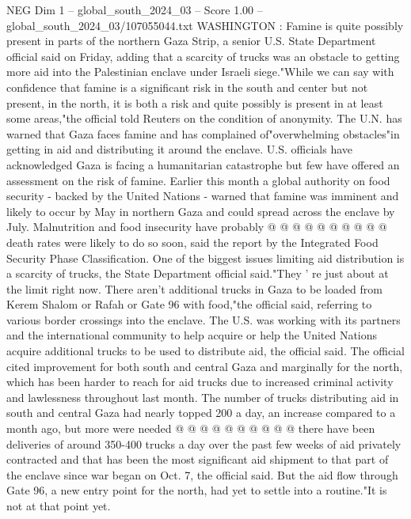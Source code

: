 \begin{textsample}{NEG Dim 1 – global\_south\_2024\_03 – Score 1.00 – global\_south\_2024\_03/107055044.txt}  \label{ex:f1_neg_116}
WASHINGTON : Famine is quite possibly present in parts of the northern Gaza Strip, a senior U.S.
State Department official said on Friday, adding that a scarcity of trucks was an obstacle to getting more aid into the Palestinian enclave under Israeli siege."While we can say with confidence that famine is a significant risk in the south and center but not present, in the north, it is both a risk and quite possibly is present in at least some areas,"the official told Reuters on the condition of anonymity.
The U.N. has warned that Gaza faces famine and has complained of"overwhelming obstacles"in getting in aid and distributing it around the enclave.
U.S. officials have acknowledged Gaza is facing a humanitarian catastrophe but few have offered an assessment on the risk of famine.
Earlier this month a global authority on food security - backed by the United Nations - warned that famine was imminent and likely to occur by May in northern Gaza and could spread across the enclave by July.
Malnutrition and food insecurity have probably @ @ @ @ @ @ @ @ @ @ death rates were likely to do so soon, said the report by the Integrated Food Security Phase Classification.
One of the biggest issues limiting aid distribution is a scarcity of trucks, the State Department official said."They ' re just about at the limit right now.
There aren't additional trucks in Gaza to be loaded from Kerem Shalom or Rafah or Gate 96 with food,"the official said, referring to various border crossings into the enclave.
The U.S. was working with its partners and the international community to help acquire or help the United Nations acquire additional trucks to be used to distribute aid, the official said.
The official cited improvement for both south and central Gaza and marginally for the north, which has been harder to reach for aid trucks due to increased criminal activity and lawlessness throughout last month.
The number of trucks distributing aid in south and central Gaza had nearly topped 200 a day, an increase compared to a month ago, but more were needed @ @ @ @ @ @ @ @ @ @ there have been deliveries of around 350-400 trucks a day over the past few weeks of aid privately contracted and that has been the most significant aid shipment to that part of the enclave since war began on Oct. 7, the official said.
But the aid flow through Gate 96, a new entry point for the north, had yet to settle into a routine."It is not at that point yet.

\end{textsample}
